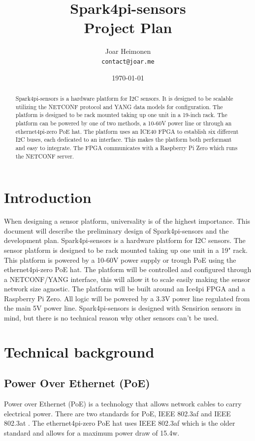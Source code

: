 \documentclass[12pt]{article}
\author{
    Joar Heimonen\\
    \texttt{contact@joar.me}
}
\title{
    \textbf{Spark4pi-sensors}\\[0.5em]
    \large Project Plan
}
\date{\today}
\begin{document}
\maketitle

\begin{abstract}
    \noindent Spark4pi-sensors is a hardware platform for I2C sensors. It is designed to be scalable utilizing the NETCONF protocol and YANG data models for configuration.
    The platform is designed to be rack mounted taking up one unit in a 19-inch rack. The platform can be powered by one of two methods, a 10-60V power line or through an
    ethernet4pi-zero PoE hat. The platform uses an ICE40 FPGA to establish six different I2C buses, each dedicated to an interface. This makes the platform both performant and easy to integrate.
    The FPGA communicates with a Raspberry Pi Zero which runs the NETCONF server.

\end{abstract}

\pagebreak

\tableofcontents

\pagebreak


\section{Introduction}
When designing a sensor platform, universality is of the highest importance. This document will describe the preliminary design of Spark4pi-sensors and the development plan.
Spark4pi-sensors is a hardware platform for I2C sensors.
The sensor platform is designed to be rack mounted taking up one unit in a 19" rack. This platform is powered by a 10-60V power supply or trough PoE using the ethernet4pi-zero PoE hat.
The platform will be controlled and configured through a NETCONF/YANG interface, this will allow it to scale easily making the sensor network size agnostic.
The platform will be built around an Ice4pi FPGA and a Raspberry Pi Zero. All logic will be powered by a 3.3V power line regulated from the main 5V power line.
Spark4pi-sensors is designed with Sensirion sensors in mind, but there is no technical reason why other sensors can't be used.


\section{Technical background}
\subsection{Power Over Ethernet (PoE)}
Power over Ethernet (PoE) is a technology that allows network cables to carry electrical power. 
There are two standards for PoE, IEEE 802.3af and IEEE 802.3at \cite{IEEEStandardsAssociation}. The ethernet4pi-zero PoE hat uses IEEE 802.3af which 
is the older standard and allows for a maximum power draw of 15.4w.
\end{document}
